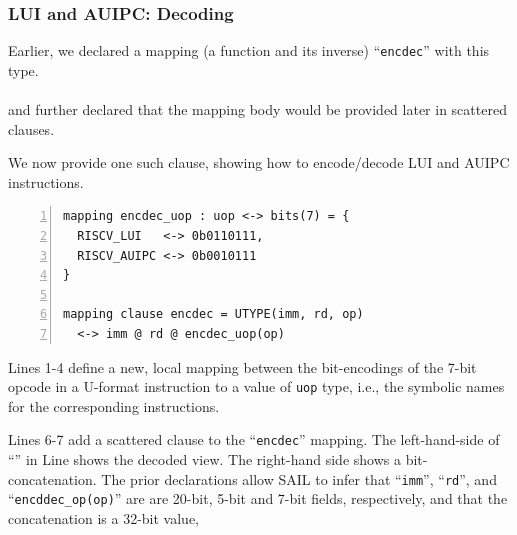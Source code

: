 \documentclass[aspectratio=169]{beamer}
\newcommand{\hmm}{\hspace*{2em}}
\newcommand{\slidefont}{\scriptsize}
\newcommand{\cf}{\scriptsize\tt}
\begin{document}

\begin{frame}[fragile]
  \frametitle{LUI and AUIPC: Decoding}

  \slidefont

  Earlier, we declared a mapping (a function and its inverse) ``{\cf encdec}'' with this type. \\
  \hmm {\tt val encdec : ast <-> bits(32)} \\
  and further declared that the mapping body would be provided later in scattered clauses.

  \vspace{1ex}
    
  We now provide one such clause, showing how to encode/decode LUI and AUIPC instructions.

  \vspace{1ex}

  \begin{Verbatim}[frame=single, numbers=left, label = File riscv\_insts\_base.sail]
mapping encdec_uop : uop <-> bits(7) = {
  RISCV_LUI   <-> 0b0110111,
  RISCV_AUIPC <-> 0b0010111
}

mapping clause encdec = UTYPE(imm, rd, op)
  <-> imm @ rd @ encdec_uop(op)
  \end{Verbatim}

  \begin{minipage}{\textwidth}
    Lines 1-4 define a new, local mapping between the bit-encodings of the 7-bit
    opcode in a U-format instruction to a value of {\cf uop} type,
    i.e., the symbolic names for the corresponding instructions.

    \vspace{1ex}

    Lines 6-7 add a scattered clause to the ``{\cf encdec}'' mapping.
    The left-hand-side of ``{\cf <->}'' in Line shows the decoded
    view.  The right-hand side shows a bit-concatenation.  The prior
    declarations allow SAIL to infer that ``{\cf imm}'', ``{\cf rd}'',
    and ``{\cf encddec\_op(op)}'' are are 20-bit, 5-bit and 7-bit
    fields, respectively, and that the concatenation is a 32-bit
    value,

  \end{minipage}

\end{frame}

\end{document}
